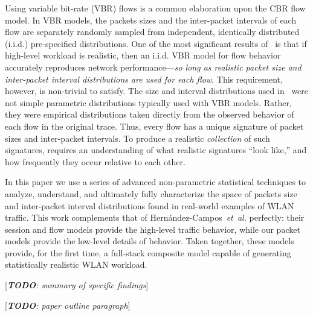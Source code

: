 \documentclass[conference]{IEEEtran}
\newcommand{\caps}[1]{{\small{#1}}}
\newcommand{\todo}[1]{[\textit{\textbf{TODO}: {#1}}]}
\begin{document}
Using variable bit-rate (\caps{VBR}) flows is a common elaboration upon the \caps{CBR} flow model. In \caps{VBR} models, the packets sizes and the inter-packet intervals of each flow are separately randomly sampled from independent, identically distributed (i.i.d.) pre-specified distributions.
One of the most significant results of~\cite{Karpinski07:realism} is that if high-level workload is realistic, then an i.i.d. \caps{VBR} model for flow behavior accurately reproduces network performance---\textit{so long as realistic packet size and inter-packet interval distributions are used for each flow}. This requirement, however, is non-trivial to satisfy. The size and interval distributions used in~\cite{Karpinski07:realism} were not simple parametric distributions typically used with \caps{VBR} models. Rather, they were empirical distributions taken directly from the observed behavior of each flow in the original trace. Thus, every flow has a unique signature of packet sizes and inter-packet intervals. To produce a realistic \textit{collection} of such signatures, requires an understanding of what realistic signatures ``look like,'' and how frequently they occur relative to each other.

In this paper we use a series of advanced non-parametric statistical techniques
to analyze, understand, and ultimately fully characterize the space of packets size and inter-packet interval distributions found in real-world examples of \caps{WLAN} traffic. This work complements that of Hern\'andez-Campos~\textit{et~al.} perfectly: their session and flow models provide the high-level traffic behavior, while our packet models provide the low-level details of behavior. Taken together, these models provide, for the first time, a full-stack composite model capable of generating statistically realistic \caps{WLAN} workload.

\todo{summary of specific findings}

\todo{paper outline paragraph}

\end{document}

